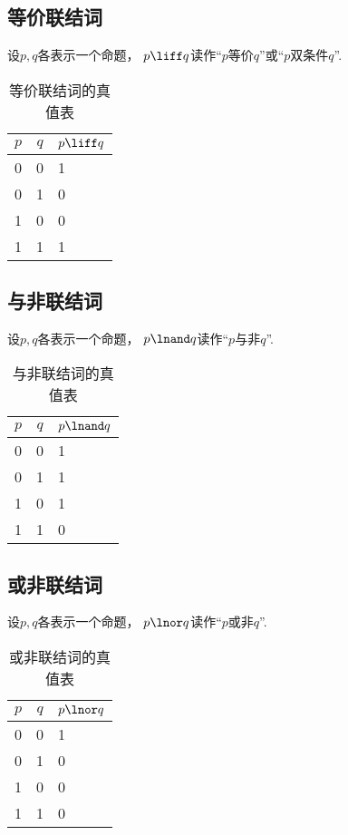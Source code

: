 \subsection{等价联结词}
设\(p,q\)各表示一个命题，
\(p \liff q\)读作“\(p\)等价\(q\)”或“\(p\)双条件\(q\)”.

\begin{table}[ht]
	\centering
	\begin{tabular}{|*{2}{c|}p{2cm}|}
		\hline
		\(p\) & \(q\) & \(p \liff q\) \\
		\hline
		0 & 0 & 1 \\
		0 & 1 & 0 \\
		1 & 0 & 0 \\
		1 & 1 & 1 \\
		\hline
	\end{tabular}
	\caption{等价联结词的真值表}
\end{table}

\subsection{与非联结词}
设\(p,q\)各表示一个命题，
\(p \lnand q\)读作“\(p\)与非\(q\)”.

\begin{table}[ht]
	\centering
	\begin{tabular}{|*{2}{c|}p{2cm}|}
		\hline
		\(p\) & \(q\) & \(p \lnand q\) \\
		\hline
		0 & 0 & 1 \\
		0 & 1 & 1 \\
		1 & 0 & 1 \\
		1 & 1 & 0 \\
		\hline
	\end{tabular}
	\caption{与非联结词的真值表}
\end{table}

\subsection{或非联结词}
设\(p,q\)各表示一个命题，
\(p \lnor q\)读作“\(p\)或非\(q\)”.

\begin{table}[ht]
	\centering
	\begin{tabular}{|*{2}{c|}p{2cm}|}
		\hline
		\(p\) & \(q\) & \(p \lnor q\) \\
		\hline
		0 & 0 & 1 \\
		0 & 1 & 0 \\
		1 & 0 & 0 \\
		1 & 1 & 0 \\
		\hline
	\end{tabular}
	\caption{或非联结词的真值表}
\end{table}


